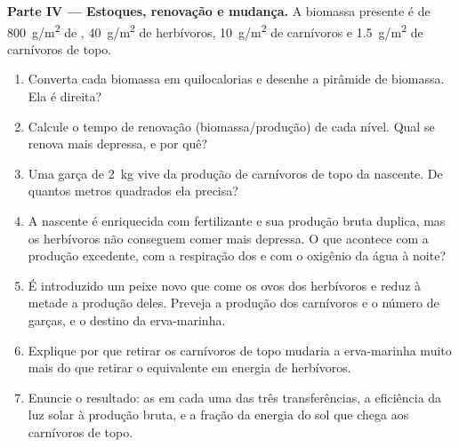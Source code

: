\begin{problem}
\medskip
\noindent\textbf{Parte IV --- Estoques, renovação e mudança.}
A biomassa presente é de \qty{800}{g/m^2} de ,
\qty{40}{g/m^2} de herbívoros, \qty{10}{g/m^2} de carnívoros e
\qty{1.5}{g/m^2} de carnívoros de topo.
\begin{enumerate}[resume]
  \item Converta cada biomassa em quilocalorias e desenhe a pirâmide
        de biomassa. Ela é direita?
  \item Calcule o tempo de renovação (biomassa/produção) de cada
        nível. Qual se renova mais depressa, e por quê?
  \item Uma garça de \qty{2}{kg} vive da produção de carnívoros de
        topo da nascente. De quantos metros quadrados ela precisa?
  \item A nascente é enriquecida com fertilizante e sua produção bruta
        duplica, mas os herbívoros não conseguem comer mais depressa.
        O que acontece com a produção excedente, com a respiração dos
         e com o oxigênio da água à noite?
  \item É introduzido um peixe novo que come os ovos dos herbívoros e
        reduz à metade a produção deles. Preveja a produção dos
        carnívoros e o número de garças, e o destino da erva-marinha.
  \item Explique por que retirar os carnívoros de topo mudaria a
        erva-marinha muito mais do que retirar o equivalente em
        energia de herbívoros.
  \item Enuncie o resultado: as  em cada uma das
        três transferências, a eficiência da luz solar à produção
        bruta, e a fração da energia do sol que chega aos carnívoros de
        topo.
\end{enumerate}
\end{problem}
